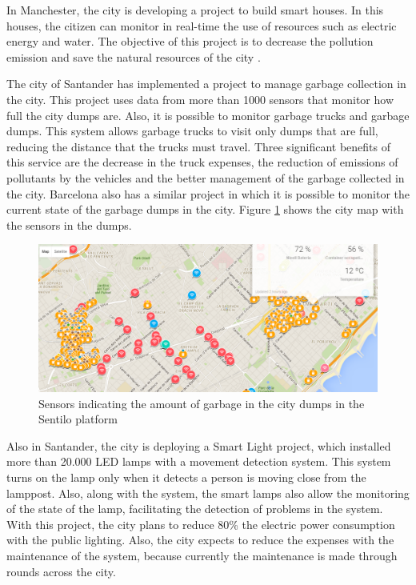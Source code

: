 In Manchester, the city is developing a project to build smart houses. In this houses, the citizen can monitor in real-time the use of resources such as electric energy and water. The objective of this project is to decrease the pollution emission and save the natural resources of the city \citep{manville2014mapping}.

The city of Santander has implemented a project to manage garbage collection in the city\citep{munoz2017santanderlixo}. This project uses data from more than 1000 sensors that monitor how full the city dumps are. Also, it is possible to monitor garbage trucks and garbage dumps. This system allows garbage trucks to visit only dumps that are full, reducing the distance that the trucks must travel. Three significant benefits of this service are the decrease in the truck expenses, the reduction of emissions of pollutants by the vehicles and the better management of the garbage collected in the city. Barcelona also has a similar project in which it is possible to monitor the current state of the garbage dumps in the city. Figure \ref{figure:sentilo} shows the city map with the sensors in the dumps.

\begin{figure}[!htb]
\centering
\includegraphics[scale=0.5]{figuras/sentilo}
\caption{Sensors indicating the amount of garbage in the city dumps in the Sentilo platform}
\label{figure:sentilo}
\end{figure}

Also in Santander, the city is deploying a Smart Light project, which installed more than 20.000 LED lamps with a movement detection system. This system turns on the lamp only when it detects a person is moving close from the lamppost. Also, along with the system, the smart lamps also allow the monitoring of the state of the lamp, facilitating the detection of problems in the system. With this project, the city plans to reduce 80\% the electric power consumption with the public lighting. Also, the city expects to reduce the expenses with the maintenance of the system, because currently the maintenance is made through rounds across the city.

